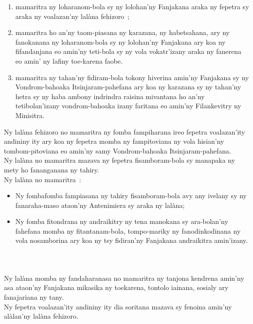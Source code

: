 \documentclass[12pt]{article}
\newcounter{laharana}
\newcommand{\andininy}[0]{
  \paragraph{%
    \NoCaseChange{%
      Andininy~\addtocounter{laharana}{1}\thelaharana.}\label{and:\thelaharana}~%
  }%
}
\begin{document}
\begin{enumerate}
\item mamaritra ny loharanom-bola sy ny lolohan'ny Fanjakana araka ny fepetra sy
  araka ny voalazan'ny lalàna fehizoro~;

\item mamaritra ho an'ny taom-piasana ny karazana, ny habetsahana, ary ny
  fanokanana ny loharanom-bola sy ny lolohan'ny Fanjakana ary koa ny
  fifandanjana eo amin'ny teti-bola sy ny vola vokatr'izany araka ny fanerena eo
  amin' ny lafiny toe-karena faobe.


\item mamaritra ny tahan'ny fidiram-bola tokony hiverina amin'ny Fanjakana sy ny
  Vondrom-bahoaka Itsinjaram-pahefana ary koa ny karazana sy ny tahan'ny hetra
  sy ny haba ambony indrindra raisina mivantana ho an'ny tetibolan'izany
  vondrom-bahoaka izany faritana eo amin'ny Filankevitry ny Minisitra.
\end{enumerate}
\noindent
Ny lalàna fehizoro no mamaritra ny fomba fampiharana ireo fepetra voalazan'ity
andininy ity ary koa ny fepetra momba ny fampitoviana ny vola hisian'ny
tombom-pitoviana eo amin'ny samy Vondrom-bahoaka Itsinjaram-pahefana.\\

\noindent
Ny lalàna no mamaritra mazava ny fepetra fisamboram-bola sy manapaka ny mety ho
fananganana ny tahiry.\\

\noindent
Ny lalàna no mamaritra~:

\begin{itemize}
\item Ny fombafomba fampiasana ny tahiry fisamboram-bola avy any ivelany sy ny
  fanaraha-maso ataon'ny Antenimiera sy araka ny lalàna;
  
\item Ny fomba fitondrana ny andraikitry ny tena manokana sy ara-bolan'ny
  fahefana momba ny fitantanam-bola, tompo-mariky ny fanodinkodinana ny vola
  nosamborina ary koa ny tsy fidiran'ny Fanjakana andraikitra amin'izany.
\end{itemize}

\andininy{}Ny lalàna momba ny fandaharanasa no mamaritra ny tanjona kendrena
amin'ny asa ataon'ny Fanjakana mikasika ny toekarena, tontolo iainana, sosialy
ary fanajariana ny tany.\\

\noindent
Ny fepetra voalazan'ity andininy ity dia soritana mazava sy fenoina amin'ny
alàlan'ny lalàna fehizoro.
\end{document}
